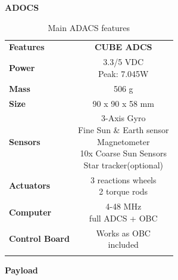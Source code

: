 \textbf{ADOCS}
\begin{longtable}{| l | c |}
	
	\hline
	\rowcolor[gray]{0.60} \multicolumn{2}{|c|}{\textbf{ADACS}} \\
	\hline
	
	\hline
	\rowcolor[gray]{0.75}	\textbf{Features} &  \textbf{CUBE ADCS} \\
	\hline
	
	\cellcolor[gray]{0.85} \textbf{Power} &\makecell{3.3/5 VDC\\ Peak: 7.045W }  \\ 	\hline
	\cellcolor[gray]{0.85} \textbf{Mass} & 506 g\\ \hline
	\cellcolor[gray]{0.85} \textbf{Size} & 90 x 90 x 58 mm \\ \hline
	\cellcolor[gray]{0.85} \textbf{Sensors} & \makecell{3-Axis Gyro\\Fine Sun \& Earth sensor \\ Magnetometer\\10x Coarse Sun Sensors \\Star tracker(optional)}\\ 	\hline
	\cellcolor[gray]{0.85} \textbf{Actuators} &  \makecell{3 reactions wheels\\2 torque rods}\\ 	\hline
	\cellcolor[gray]{0.85} \textbf{Computer} &\makecell{4-48 MHz\\ full ADCS + OBC}   \\ \hline
	\cellcolor[gray]{0.85} \textbf{Control Board} & \makecell{Works as OBC\\included}\\
	\hline
	
	\caption{Main ADACS features}
	\label{ADACS}
	
\end{longtable}
\clearpage
\textbf{Payload}
